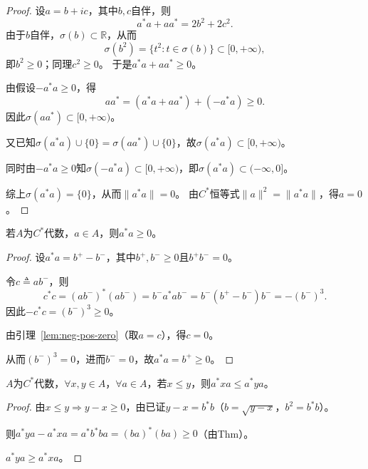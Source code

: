 \documentclass[lang=cn,a4paper,newtx,section]{elegantbook}
\begin{document}
\begin{proof}
  设$a = b + ic$，其中$b, c$自伴，则
  \begin{equation*}
    a^*a + aa^* = 2b^2 + 2c^2.
  \end{equation*}
  由于$b$自伴，$\sigma(b) \subset \mathbb{R}$，从而
  \begin{equation*}
    \sigma(b^2) = \{t^2 : t \in \sigma(b)\} \subset [0, +\infty),
  \end{equation*}
  即$b^2 \geq 0$；同理$c^2 \geq 0$。
  于是$a^*a + aa^* \geq 0$。
  
  由假设$-a^*a \geq 0$，得
  \begin{equation*}
    aa^* = (a^*a + aa^*) + (-a^*a) \geq 0.
  \end{equation*}
  因此$\sigma(aa^*) \subset [0, +\infty)$。
  
  又已知$\sigma(a^*a) \cup \{0\} = \sigma(aa^*) \cup \{0\}$，故$\sigma(a^*a) \subset [0, +\infty)$。
  
  同时由$-a^*a \geq 0$知$\sigma(-a^*a) \subset [0, +\infty)$，即$\sigma(a^*a) \subset (-\infty, 0]$。
  
  综上$\sigma(a^*a) = \{0\}$，从而$\|a^*a\| = 0$。
  由$C^*$恒等式$\|a\|^2 = \|a^*a\|$，得$a = 0$。
\end{proof}

\begin{theorem}
  若$A$为$C^*$代数，$a \in A$，则$a^*a \geq 0$。
\end{theorem}

\begin{proof}
  设$a^*a = b^+ - b^-$，其中$b^+, b^- \geq 0$且$b^+b^- = 0$。
  
  令$c \triangleq ab^-$，则
  \begin{equation*}
    c^*c = (ab^-)^*(ab^-) = b^-a^*ab^- = b^-(b^+ - b^-)b^- = -(b^-)^3.
  \end{equation*}
  因此$-c^*c = (b^-)^3 \geq 0$。
  
  由引理~\ref{lem:neg-pos-zero}（取$a=c$），得$c = 0$。
  
  从而$(b^-)^3 = 0$，进而$b^- = 0$，故$a^*a = b^+ \geq 0$。
\end{proof}

\begin{proposition}\label{prop:conj-order}
  $A$为$C^*$代数，$\forall x, y \in A$，$\forall a \in A$，若$x \leq y$，则$a^*xa \leq a^*ya$。
\end{proposition}

\begin{proof}
  由$x \leq y \Rightarrow y - x \geq 0$，由已证$y - x = b^*b$（$b = \sqrt{y - x}$，$b^2 = b^*b$）。
  
  则$a^*ya - a^*xa = a^*b^*ba = (ba)^*(ba) \geq 0$（由Thm）。
  
  $a^*ya \geq a^*xa$。
\end{proof}
\end{document}

